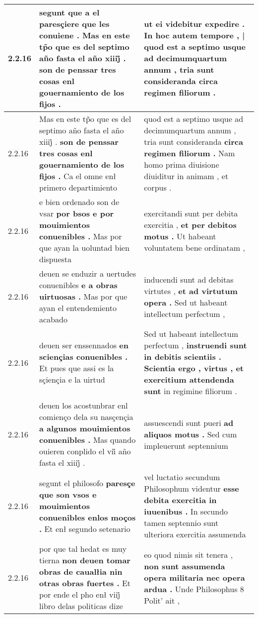 \begin{tabular}{|p{1cm}|p{6.5cm}|p{6.5cm}|}
2.2.16 & segunt que a el paresçiere que les conuiene . \textbf{ Mas en este tp̃o que es del septimo año fasta el año xiiij̊ . } son de penssar tres cosas enl gouernamiento de los fijos . & ut ei videbitur expedire . \textbf{ In hoc autem tempore , | quod est a septimo usque ad decimumquartum annum , tria sunt consideranda } circa regimen filiorum . \\\hline
2.2.16 & Mas en este tp̃o que es del septimo año fasta el año xiiij̊ . \textbf{ son de penssar tres cosas enl gouernamiento de los fijos . } Ca el omne enł primero departimiento & quod est a septimo usque ad decimumquartum annum , tria sunt consideranda \textbf{ circa regimen filiorum . } Nam homo prima diuisione diuiditur in animam , et corpus . \\\hline
2.2.16 & e bien ordenado son de vsar \textbf{ por bsos e por mouimientos conuenibles . } Mas por que ayan la uoluntad bien dispuesta & exercitandi sunt per debita exercitia , \textbf{ et per debitos motus . } Ut habeant voluntatem bene ordinatam , \\\hline
2.2.16 & deuen se enduzir a uertudes conuenibles \textbf{ e a obras uirtuosas . } Mas por que ayan el entendemiento acabado & inducendi sunt ad debitas virtutes , \textbf{ et ad virtutum opera . } Sed ut habeant intellectum perfectum , \\\hline
2.2.16 & deuen ser enssennados \textbf{ en sciençias conuenibles . } Et pues que assi es la sçiençia e la uirtud & Sed ut habeant intellectum perfectum , \textbf{ instruendi sunt in debitis scientiis . Scientia ergo , virtus , et exercitium attendenda sunt } in regimine filiorum . \\\hline
2.2.16 & deuen los acostunbrar enl comienço dela su nasçençia \textbf{ a algunos mouimientos conuenibles . } Mas quando ouieren conplido el vii̊ año fasta el xiiij̊ . & assuescendi sunt pueri \textbf{ ad aliquos motus . } Sed cum impleuerunt septennium \\\hline
2.2.16 & segunt el philosofo \textbf{ paresçe que son vsos e mouimientos conuenibles enlos moços . } Et enł segundo setenario & vel luctatio secundum Philosophum videntur \textbf{ esse debita exercitia in iuuenibus . } In secundo tamen septennio sunt ulteriora exercitia assumenda \\\hline
2.2.16 & por que tal hedat es muy tierna \textbf{ non deuen tomar obras de caualłia nin otras obras fuertes . } Et por ende el pho enł viij̊ libro delas politicas dize & eo quod nimis sit tenera , \textbf{ non sunt assumenda opera militaria nec opera ardua . } Unde Philosophus 8 Polit’ ait , \\\hline

\end{tabular}
